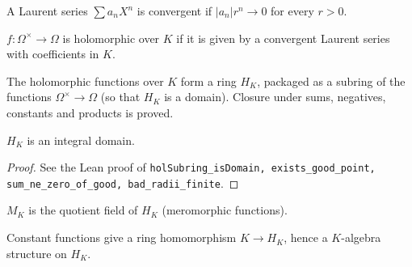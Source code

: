 \begin{definition}
\label{def:convergent-laurent}
\leanok
A Laurent series $\sum a_n X^n$ is convergent if $|a_n|r^n\to 0$ for every $r>0$.
\end{definition}

\begin{definition}
\label{def:holomorphic}
\leanok
$f:\Omega^\times\to\Omega$ is holomorphic over $K$ if it is given by a convergent Laurent series with coefficients in $K$.
\end{definition}

\begin{definition}
\label{def:H-K}
\leanok
The holomorphic functions over $K$ form a ring $H_K$, packaged as a subring of the functions $\Omega^\times\to\Omega$ (so that $H_K$ is a domain). Closure under sums, negatives, constants and products is proved.
\end{definition}

\begin{lemma}[$H_K$ is a domain]
\label{lem:H-K-domain}
\leanok
$H_K$ is an integral domain.
\end{lemma}
\begin{proof}
\leanok
See the Lean proof of \texttt{holSubring\_isDomain, exists\_good\_point, sum\_ne\_zero\_of\_good, bad\_radii\_finite}.
\end{proof}

\begin{definition}
\label{def:M-K}
\leanok
$M_K$ is the quotient field of $H_K$ (meromorphic functions).
\end{definition}

\begin{definition}[$K$-structure on $H_K$]
\label{def:const-algebra}
\leanok
Constant functions give a ring homomorphism $K\to H_K$, hence a $K$-algebra structure on $H_K$.
\end{definition}

